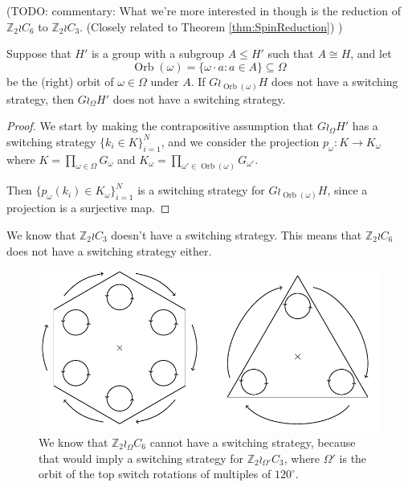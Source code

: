 (TODO: commentary: What we're more interested in though is the reduction of
$\mathbb Z_2 \wr C_6$ to $\mathbb Z_2 \wr C_3$.
(Closely related to Theorem \ref{thm:SpinReduction})
)
\begin{theorem}
  Suppose that $H'$ is a group with a subgroup $A \leq H'$ such that
  $A \cong H$,
  and let \[
    \operatorname{Orb}(\omega) = \{\omega \cdot a : a \in A \} \subseteq \Omega
  \]
  be the (right) orbit of $\omega \in \Omega$ under $A$.
  If $G \wr_{\operatorname{Orb}(\omega)} H$ does not have a switching strategy,
  then $G \wr_\Omega H'$ does not have a switching strategy.
  \label{thm:SpinReduction2}
\end{theorem}
\begin{proof}
  We start by making the contrapositive assumption that $G \wr_\Omega H'$
  has a switching strategy $\{k_i \in K\}_{i=1}^N$, and we consider the projection
  $p_\omega \colon K \rightarrow K_\omega$ where
  $K = \prod_{\omega \in \Omega} G_\omega$ and
  $K_{\omega} = \prod_{\omega' \in \operatorname{Orb}(\omega)} G_{\omega'}$.

  Then $\{p_\omega(k_i) \in K_\omega\}_{i=1}^N$ is a switching strategy for
  $G \wr_{\operatorname{Orb}(\omega)} H$, since a projection is a surjective
  map.
\end{proof}

\begin{example}
  We know that $\mathbb Z_2 \wr C_3$ doesn't have a switching strategy.
  This means that $\mathbb Z_2 \wr C_6$ does not have a switching strategy either.
  \begin{figure}
    \center
    \includegraphics{assets/tikz_Z2C6_2.pdf}
    \caption{We know that $\mathbb Z_2 \wr_\Omega C_6$ cannot have
    a switching strategy, because that would imply a switching strategy for
    $\mathbb Z_2 \wr_{\Omega'} C_3$, where $\Omega'$
    is the orbit of the top switch rotations of multiples of $120^\circ$.}
  \end{figure}
\end{example}

